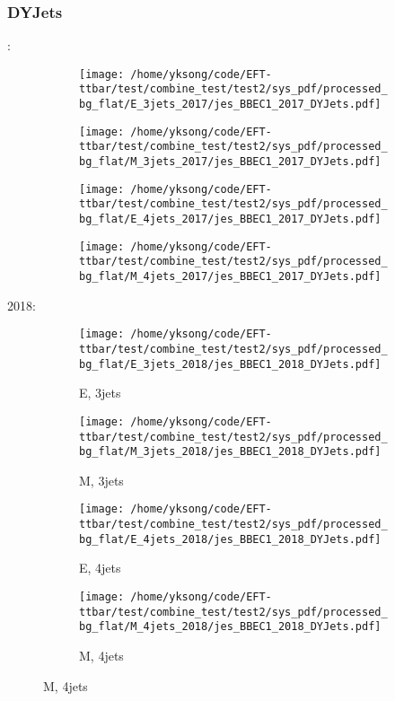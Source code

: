 \documentclass{beamer}
\begin{document}
\begin{frame}
\frametitle{DYJets}
\fontsize{5}{1}:
\begin{figure}
\centering
\begin{subfigure}[b]{0.24\textwidth}
\texttt{[image: /home/yksong/code/EFT-ttbar/test/combine\_test/test2/sys\_pdf/processed\_bg\_flat/E\_3jets\_2017/jes\_BBEC1\_2017\_DYJets.pdf]}
\end{subfigure}
\begin{subfigure}[b]{0.24\textwidth}
\texttt{[image: /home/yksong/code/EFT-ttbar/test/combine\_test/test2/sys\_pdf/processed\_bg\_flat/M\_3jets\_2017/jes\_BBEC1\_2017\_DYJets.pdf]}
\end{subfigure}
\begin{subfigure}[b]{0.24\textwidth}
\texttt{[image: /home/yksong/code/EFT-ttbar/test/combine\_test/test2/sys\_pdf/processed\_bg\_flat/E\_4jets\_2017/jes\_BBEC1\_2017\_DYJets.pdf]}
\end{subfigure}
\begin{subfigure}[b]{0.24\textwidth}
\texttt{[image: /home/yksong/code/EFT-ttbar/test/combine\_test/test2/sys\_pdf/processed\_bg\_flat/M\_4jets\_2017/jes\_BBEC1\_2017\_DYJets.pdf]}
\end{subfigure}
\end{figure}
2018:
\begin{figure}
\centering
\begin{subfigure}[b]{0.24\textwidth}
\texttt{[image: /home/yksong/code/EFT-ttbar/test/combine\_test/test2/sys\_pdf/processed\_bg\_flat/E\_3jets\_2018/jes\_BBEC1\_2018\_DYJets.pdf]}
\captionsetup{font=tiny}
\caption{E, 3jets}
\end{subfigure}
\begin{subfigure}[b]{0.24\textwidth}
\texttt{[image: /home/yksong/code/EFT-ttbar/test/combine\_test/test2/sys\_pdf/processed\_bg\_flat/M\_3jets\_2018/jes\_BBEC1\_2018\_DYJets.pdf]}
\captionsetup{font=tiny}
\caption{M, 3jets}
\end{subfigure}
\begin{subfigure}[b]{0.24\textwidth}
\texttt{[image: /home/yksong/code/EFT-ttbar/test/combine\_test/test2/sys\_pdf/processed\_bg\_flat/E\_4jets\_2018/jes\_BBEC1\_2018\_DYJets.pdf]}
\captionsetup{font=tiny}
\caption{E, 4jets}
\end{subfigure}
\begin{subfigure}[b]{0.24\textwidth}
\texttt{[image: /home/yksong/code/EFT-ttbar/test/combine\_test/test2/sys\_pdf/processed\_bg\_flat/M\_4jets\_2018/jes\_BBEC1\_2018\_DYJets.pdf]}
\captionsetup{font=tiny}
\caption{M, 4jets}
\end{subfigure}
\end{figure}
\end{frame}
\end{document}
